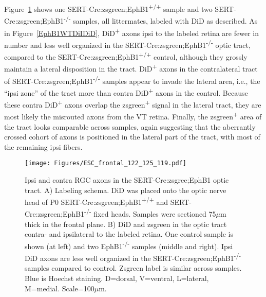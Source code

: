 Figure~\ref{ESCfrontal} shows one SERT-Cre:zsgreen;EphB1\textsuperscript{+/+} sample and two SERT-Cre:zsgreen;EphB1\textsuperscript{-/-} samples, all littermates, labeled with DiD as described.
As in Figure~\ref{EphB1WTDiIDiD}, DiD\textsuperscript{+} axons ipsi to the labeled retina are fewer in number and less well organized in the SERT-Cre:zsgreen;EphB1\textsuperscript{-/-} optic tract, compared to the SERT-Cre:zsgreen;EphB1\textsuperscript{+/+} control, although they grossly maintain a lateral disposition in the tract.
DiD\textsuperscript{+} axons in the contralateral tract of SERT-Cre:zsgreen;EphB1\textsuperscript{-/-} samples appear to invade the lateral area, i.e., the ``ipsi zone'' of the tract more than contra DiD\textsuperscript{+} axons in the control.
Because these contra DiD\textsuperscript{+} axons overlap the zsgreen\textsuperscript{+} signal in the lateral tract, they are most likely the misrouted axons from the VT retina.
Finally, the zsgreen\textsuperscript{+} area of the tract looks comparable across samples, again suggesting that the aberrantly crossed cohort of axons is positioned in the lateral part of the tract, with most of the remaining ipsi fibers.
\begin{figure}[hbtp]
    \begin{center}
        \texttt{[image: Figures/ESC\_frontal\_122\_125\_119.pdf]}
        \caption[Ipsi and contra RGC axons in the SERT-Cre:zsgree;EphB1 optic tract.]
        {Ipsi and contra RGC axons in the SERT-Cre:zsgree;EphB1 optic tract.
		A) Labeling schema.
		DiD was placed onto the optic nerve head of P0 SERT-Cre:zsgreen;EphB1\textsuperscript{+/+} and SERT-Cre:zsgreen;EphB1\textsuperscript{-/-} fixed heads.
		Samples were sectioned 75$\mu$m thick in the frontal plane.
		B) DiD and zsgreen in the optic tract contra- and ipsilateral to the labeled retina. 
		One control sample is shown (at left) and two EphB1\textsuperscript{-/-} samples (middle and right).
		Ipsi DiD axons are less well organized in the SERT-Cre:zsgreen;EphB1\textsuperscript{-/-} samples compared to control.
		Zsgreen label is similar across samples.
		Blue is Hoechst staining.
		D=dorsal, V=ventral, L=lateral, M=medial.
		Scale=100$\mu$m.}
        \label{ESCfrontal}
    \end{center}
\end{figure}


